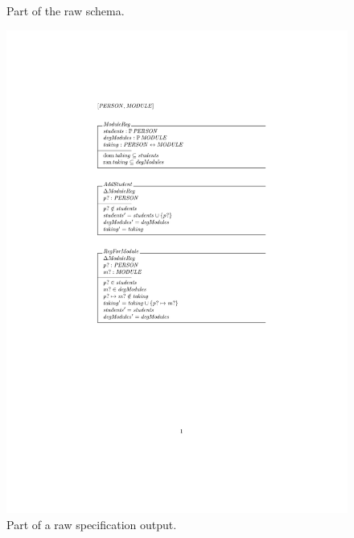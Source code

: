 \begin{figure}[H]
\begin{minipage}{0.45\textwidth}
\begin{tiny}
\begin{BVerbatim}
\end{BVerbatim}
\end{tiny}
\caption{Part of the raw schema.\label{fig:rawschema}}
\end{minipage}\hfill
\begin{minipage}{0.45\textwidth}
\centering
\includegraphics[clip, trim=5cm 11.5cm 10cm 5.5cm, width=1.00\textwidth]{examples/modulereg/0.pdf}
\vspace{-0.2in}
\caption{Part of a raw specification output. \label{fig:rawschemaout}}
\vspace{-0.2in}
\end{minipage}
\end{figure}


